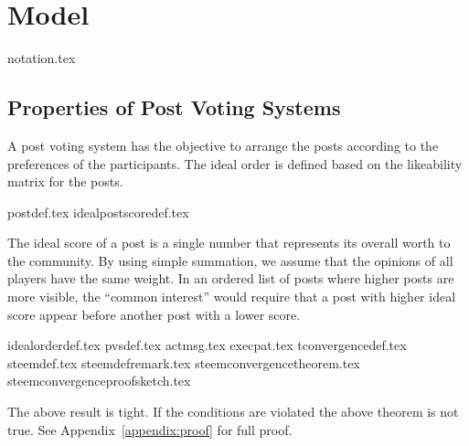 \section{Model}
  {notation.tex}
  \subsection{Properties of Post Voting Systems}
    A post voting system has the objective to arrange the posts according to the
    preferences of the participants. The ideal order is defined based on the
    likeability matrix for the posts.

    {postdef.tex}
    {idealpostscoredef.tex}

    The ideal score of a post is a single number that represents its overall
    worth to the community. By using simple summation, we assume that the
    opinions of all players have the same weight. In an ordered list of posts
    where higher posts are more visible, the ``common interest'' would require
    that a post with higher ideal score appear before another post with a lower
    score.

    {idealorderdef.tex}
    {pvsdef.tex}
    {actmsg.tex}
    {execpat.tex}
    {tconvergencedef.tex}
    {steemdef.tex}
    {steemdefremark.tex}
    {steemconvergencetheorem.tex}
    {steemconvergenceproofsketch.tex}

    The above result is tight. If the conditions are violated the above theorem
    is not true. See Appendix~\ref{appendix:proof} for full proof.
